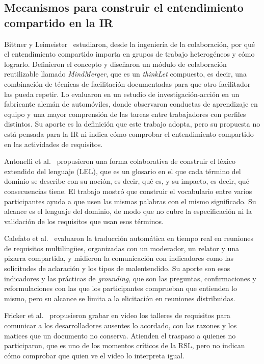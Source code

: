 \documentclass[12pt,letterpaper,oneside]{report}
\begin{document}
\subsection{Mecanismos para construir el entendimiento compartido en la IR}
Bittner y Leimeister~\cite{bittner2014shared} estudiaron, desde la ingeniería
de la colaboración, por qué el entendimiento compartido importa en grupos de
trabajo heterogéneos y cómo lograrlo. Definieron el concepto y diseñaron un módulo de colaboración reutilizable
llamado \textit{MindMerger}, que es un \textit{thinkLet} compuesto, es decir,
una combinación de técnicas de facilitación documentadas para que otro facilitador las pueda repetir. Lo evaluaron en un estudio de investigación-acción en un
fabricante alemán de automóviles, donde observaron conductas de aprendizaje en
equipo y una mayor comprensión de las tareas entre trabajadores con perfiles
distintos. Su aporte es la definición que este trabajo adopta, pero su
propuesta no está pensada para la IR ni indica cómo comprobar el entendimiento compartido
en las actividades de requisitos.

Antonelli et al.~\cite{antonelli2016} propusieron una forma colaborativa de
construir el léxico extendido del lenguaje (LEL), que es un glosario en el que
cada término del dominio se describe con su noción, es decir, qué es, y su
impacto, es decir, qué consecuencias tiene. El trabajo mostró que construir el
vocabulario entre varios participantes ayuda a que usen las mismas palabras con
el mismo significado. Su alcance es el lenguaje del dominio, de modo que no
cubre la especificación ni la validación de los requisitos que usan esos
términos.

Calefato et al.~\cite{calefato2015} evaluaron la traducción automática en tiempo
real en reuniones de requisitos multilingües, organizadas con un moderador, un
relator y una pizarra compartida, y midieron la comunicación con indicadores
como las solicitudes de aclaración y los tipos de malentendido. Su aporte son
esos indicadores y las prácticas de \textit{grounding}, que son las preguntas,
confirmaciones y reformulaciones con las que los participantes comprueban que
entienden lo mismo, pero su alcance se limita a la elicitación en reuniones
distribuidas.

Fricker et al.~\cite{fricker2015} propusieron grabar en video los talleres de
requisitos para comunicar a los desarrolladores ausentes lo acordado, con las
razones y los matices que un documento no conserva. Atienden el traspaso a
quienes no participaron, que es uno de los momentos críticos de la RSL, pero no
indican cómo comprobar que quien ve el video lo interpreta igual.
\end{document}
